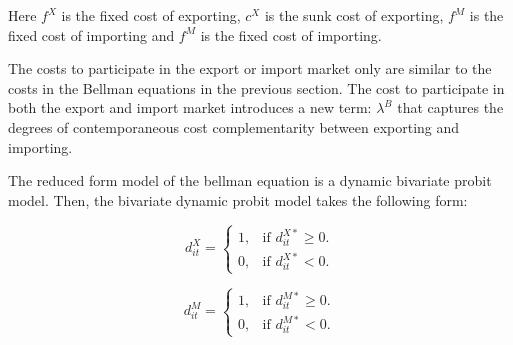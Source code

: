 \documentclass[12pt]{article}
\begin{document}
Here $f^{X}$ is the fixed cost of exporting, $c^{X}$ is the sunk cost
of exporting, $f^{M}$ is the fixed cost of importing and $f^{M}$ is the
fixed cost of importing.

The costs to participate in the export or import market only are
similar to the costs in the Bellman equations in the previous
section. The cost to participate in both the export and import market
introduces a new term: $\lambda^B$  that captures the degrees of
contemporaneous cost complementarity between exporting and importing. 

The reduced form model of the bellman equation is a dynamic bivariate
probit model.  Then, the bivariate dynamic probit model  takes the following form:

\begin{equation}
  d_{it}^{X}=\begin{cases}
   1 , & \text{if $d_{it}^{X*}\geq 0$}.\\
   0 , & \text{if $d_{it}^{X*}<  0$}.
  \end{cases}
\end{equation}

\begin{equation}
  d_{it}^{M}=\begin{cases}
   1 , & \text{if $d_{it}^{M*} \geq  0$}.\\
   0 , & \text{if $d_{it}^{M*}<  0$}.
  \end{cases}
\end{equation}
\end{document}
